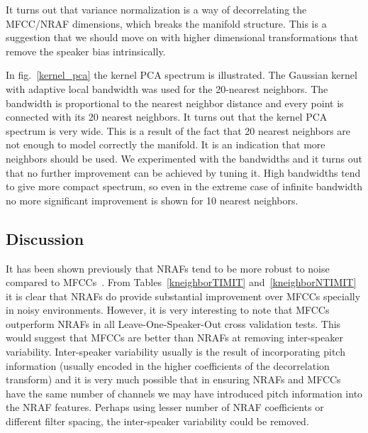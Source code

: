 \documentclass[12pt,letterpaper,doublespaced,ETD,dvips,proposal]{gtthesis}
\begin{document}
\begin{Body}
It turns out that variance normalization is a way of decorrelating
the MFCC/NRAF dimensions, which breaks the manifold structure. This
is a suggestion that we should move on with higher dimensional
transformations that remove the speaker bias intrinsically.

In fig.~\ref{kernel_pca} the kernel PCA spectrum is illustrated. The
Gaussian kernel with adaptive local bandwidth was used for the
20-nearest neighbors. The bandwidth is proportional to the nearest
neighbor distance and every point is connected with its 20 nearest
neighbors. It turns out that the kernel PCA spectrum is very wide.
This is a result of the fact that 20 nearest neighbors are not
enough to model correctly the manifold. It is an indication that
more neighbors should be used. We experimented with the bandwidths
and it turns out that no further improvement can be achieved by
tuning it. High bandwidths tend to give more compact spectrum, so
even in the extreme case of infinite bandwidth no more significant
improvement is shown for 10 nearest neighbors.

\subsection{Discussion}
It has been shown previously that NRAFs tend to be more robust to
noise compared to MFCCs~\cite{ravindran:inr}. From
Tables~\ref{kneighborTIMIT} and~\ref{kneighborNTIMIT} it is clear
that NRAFs do provide substantial improvement over MFCCs specially
in noisy environments. However, it is very interesting to note that
MFCCs outperform NRAFs in all Leave-One-Speaker-Out cross validation
tests. This would suggest that MFCCs are better than NRAFs at
removing inter-speaker variability. Inter-speaker variability
usually is the result of incorporating pitch information (usually
encoded in the higher coefficients of the decorrelation transform)
and it is very much possible that in ensuring NRAFs and MFCCs have
the same number of channels we may have introduced pitch information
into the NRAF features. Perhaps using lesser number of NRAF
coefficients or different filter spacing, the inter-speaker
variability could be removed.






\end{Body}
\end{document}
